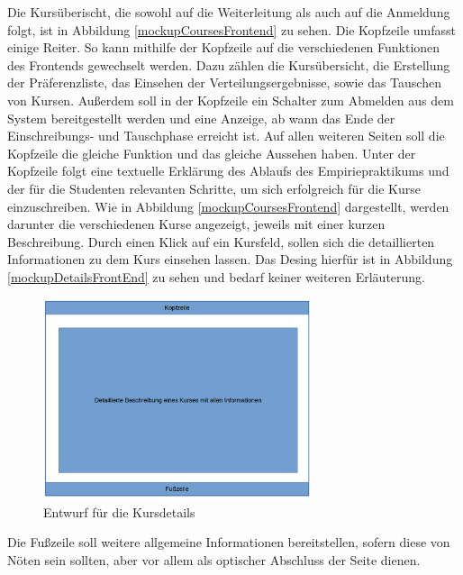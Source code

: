         Die Kursüberischt, die sowohl auf die Weiterleitung als auch auf die Anmeldung folgt, ist in Abbildung \ref{mockupCoursesFrontend} zu sehen.
        Die Kopfzeile umfasst einige Reiter.
        So kann mithilfe der Kopfzeile auf die verschiedenen Funktionen des Frontends gewechselt werden. 
        Dazu zählen die Kursübersicht, die Erstellung der Präferenzliste, das Einsehen der Verteilungsergebnisse, sowie das Tauschen von Kursen.
        Außerdem soll in der Kopfzeile ein Schalter zum Abmelden aus dem System bereitgestellt werden und eine Anzeige, ab wann das Ende der Einschreibungs- und Tauschphase erreicht ist.
        Auf allen weiteren Seiten soll die Kopfzeile die gleiche Funktion und das gleiche Aussehen haben.
        Unter der Kopfzeile folgt eine textuelle Erklärung des Ablaufs des Empiriepraktikums und der für die Studenten relevanten Schritte, um sich erfolgreich für die Kurse einzuschreiben.
        Wie in Abbildung \ref{mockupCoursesFrontend} dargestellt, werden darunter die verschiedenen Kurse angezeigt, jeweils mit einer kurzen Beschreibung.
        Durch einen Klick auf ein Kursfeld, sollen sich die detaillierten Informationen zu dem Kurs einsehen lassen.
        Das Desing hierfür ist in Abbildung \ref{mockupDetailsFrontEnd} zu sehen und bedarf keiner weiteren Erläuterung.
        \begin{figure}[t]
        	\centering
        	\includegraphics[width=0.7\textwidth]{./design/MockUpsFrontend/kursdetails.png}
        	\caption{Entwurf für die Kursdetails}
        	\label{mockupDetailsFrontend}
        \end{figure}
        Die Fußzeile soll weitere allgemeine Informationen bereitstellen, sofern diese von Nöten sein sollten, aber vor allem als optischer Abschluss der Seite dienen.
